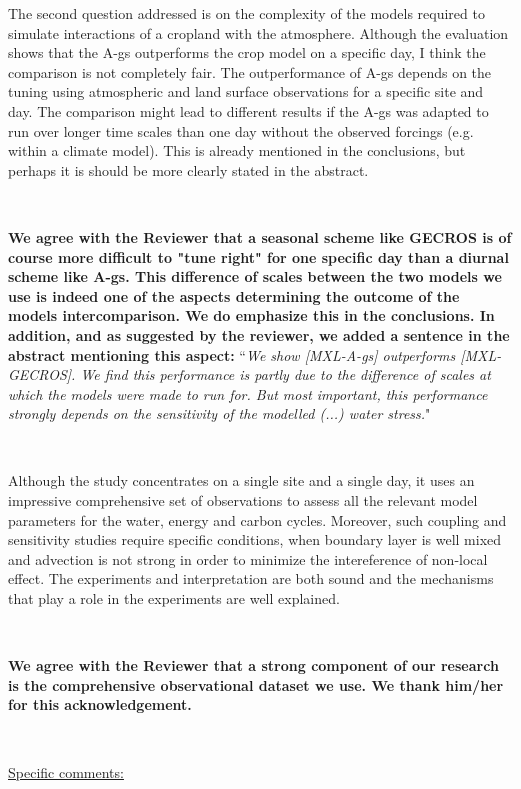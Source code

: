 \documentclass[10pt,a4paper,notitlepage,twoside]{article}
\begin{document}
The second question addressed is on the complexity of the models required to simulate interactions of a cropland with the atmosphere. Although the evaluation shows that the A-gs
outperforms the crop model on a specific day, I think the comparison is not completely fair. The outperformance of A-gs depends on the tuning using atmospheric and land surface observations for a specific site and day. The comparison might lead to different results if the A-gs
was adapted to run over longer time scales than one day without the observed forcings (e.g.
within a climate model). This is already mentioned in the conclusions, but perhaps it is should
be more clearly stated in the abstract.

\

\textbf{We agree with the Reviewer that a seasonal scheme like GECROS is of course more difficult to "tune right" for one specific day than a diurnal scheme like A-gs. This difference of scales between the two models we use is indeed one of the aspects determining the outcome of the models intercomparison. We do emphasize this in the conclusions. 
In addition, and as suggested by the reviewer, we added a sentence in the abstract mentioning this aspect:}
``\textit{We show [MXL-A-gs] outperforms [MXL-GECROS]. We find this performance is partly due to the difference of scales at which the models were made to run for. But most important, this performance strongly depends on the sensitivity of the modelled (...) water stress.}"

\

Although the study concentrates on a single site and a single day, it uses an impressive 
comprehensive set of observations to assess all the relevant model parameters for the water, energy and
carbon cycles. Moreover, such coupling and sensitivity studies require specific conditions, when
boundary layer is well mixed and advection is not strong in order to minimize the intereference
of non-local effect. The experiments and interpretation are both sound and the mechanisms
that play a role in the experiments are well explained.

\

\textbf{We agree with the Reviewer that a strong component of our research is the comprehensive observational dataset we use. We thank him/her for this acknowledgement. }

\

\underline{Specific comments:}
\end{document}
